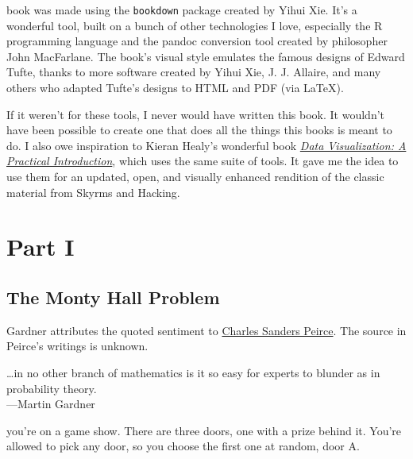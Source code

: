 \documentclass[justified]{tufte-book}
\newenvironment{epigraph}%
{
\begin{flushright}    
\begin{minipage}{20em}
\begin{flushright}
\itshape
}%
{
\end{flushright}
\end{minipage}
\end{flushright}
}
\theoremstyle{definition}
\theoremstyle{definition}
\theoremstyle{definition}
\theoremstyle{remark}
\begin{document}
 book was made using the \texttt{bookdown} package
created by Yihui Xie. It's a wonderful tool, built on a bunch of other
technologies I love, especially the R programming language and the
pandoc conversion tool created by philosopher John MacFarlane. The
book's visual style emulates the famous designs of Edward Tufte, thanks
to more software created by Yihui Xie, J. J. Allaire, and many others
who adapted Tufte's designs to HTML and PDF (via LaTeX).

If it weren't for these tools, I never would have written this book. It
wouldn't have been possible to create one that does all the things this
books is meant to do. I also owe inspiration to Kieran Healy's wonderful
book \href{http://socviz.co/}{\emph{Data Visualization: A Practical
Introduction}}, which uses the same suite of tools. It gave me the idea
to use them for an updated, open, and visually enhanced rendition of the
classic material from Skyrms and Hacking.

\hypertarget{part-part-i}{%
\part*{Part I}\label{part-part-i}}

\hypertarget{the-monty-hall-problem}{%
\chapter{The Monty Hall Problem}\label{the-monty-hall-problem}}

\begin{marginfigure}
Gardner attributes the quoted sentiment to
\href{https://en.wikipedia.org/wiki/Charles_Sanders_Peirce}{Charles
Sanders Peirce}. The source in Peirce's writings is unknown.
\end{marginfigure}

\begin{epigraph}
\ldots{}in no other branch of mathematics is it so easy for experts to
blunder as in probability theory.\\
---Martin Gardner
\end{epigraph}

 you're on a game show. There are three doors, one
with a prize behind it. You're allowed to pick any door, so you choose
the first one at random, door A.
\end{document}
